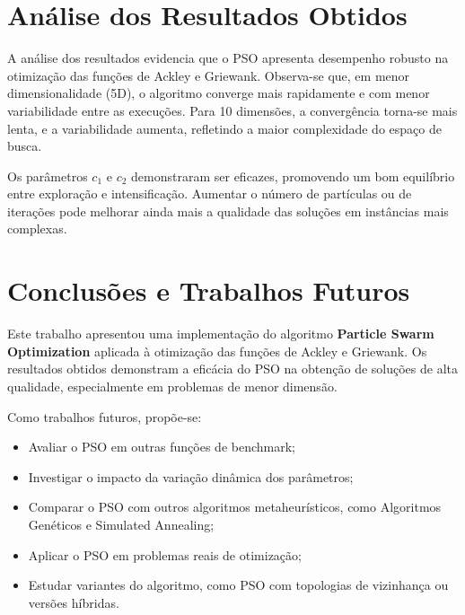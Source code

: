 \documentclass[12pt]{article}
\begin{document}
\section{Análise dos Resultados Obtidos}
\label{sec:analise_dos_resultados_obtidos}

A análise dos resultados evidencia que o PSO apresenta desempenho robusto na otimização das funções de Ackley e Griewank. Observa-se que, em menor dimensionalidade (5D), o algoritmo converge mais rapidamente e com menor variabilidade entre as execuções. Para 10 dimensões, a convergência torna-se mais lenta, e a variabilidade aumenta, refletindo a maior complexidade do espaço de busca.

Os parâmetros $c_1$ e $c_2$ demonstraram ser eficazes, promovendo um bom equilíbrio entre exploração e intensificação. Aumentar o número de partículas ou de iterações pode melhorar ainda mais a qualidade das soluções em instâncias mais complexas.

\section{Conclusões e Trabalhos Futuros}
\label{sec:conclusoes_e_trabalhos_futuros}

Este trabalho apresentou uma implementação do algoritmo \textbf{Particle Swarm Optimization} aplicada à otimização das funções de Ackley e Griewank. Os resultados obtidos demonstram a eficácia do PSO na obtenção de soluções de alta qualidade, especialmente em problemas de menor dimensão.

Como trabalhos futuros, propõe-se:
\begin{itemize}
    \item Avaliar o PSO em outras funções de benchmark;
    \item Investigar o impacto da variação dinâmica dos parâmetros;
    \item Comparar o PSO com outros algoritmos metaheurísticos, como Algoritmos Genéticos e Simulated Annealing;
    \item Aplicar o PSO em problemas reais de otimização;
    \item Estudar variantes do algoritmo, como PSO com topologias de vizinhança ou versões híbridas.
\end{itemize}



\end{document}
